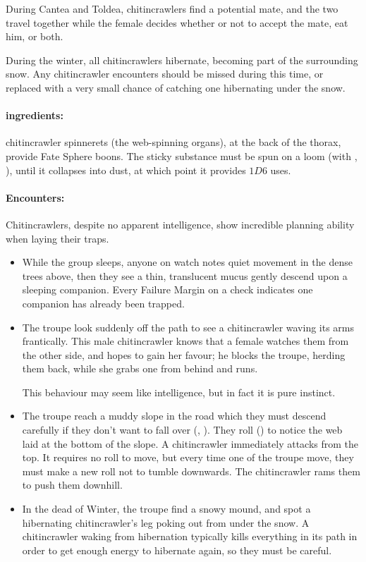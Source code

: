 \begin{multicols}{2}
During Cantea and Toldea, chitincrawlers find a potential mate, and the two travel together while the female decides whether or not to accept the mate, eat him, or both.

During the winter, all chitincrawlers hibernate, becoming part of the surrounding snow.
Any chitincrawler encounters should be missed during this time, or replaced with a very small chance of catching one hibernating under the snow.

\paragraph{\Glspl{ingredient}:}
chitincrawler spinnerets (the web-spinning organs), at the back of the thorax, provide Fate Sphere \glspl{boon}.
The sticky substance must be spun on a loom (with , \tn[10]), until it collapses into dust, at which point it provides $1D6$ uses.

\paragraph{Encounters:} Chitincrawlers, despite no apparent intelligence, show incredible planning ability when laying their traps.

\begin{itemize}
  \item
  While the group sleeps, anyone on watch notes quiet movement in the dense trees above, then they see a thin, translucent mucus gently descend upon a sleeping companion.
  Every Failure Margin on a  check indicates one companion has already been trapped.
  \item
  The troupe look suddenly off the path to see a chitincrawler waving its arms frantically.
  This male chitincrawler knows that a female watches them from the other side, and hopes to gain her favour; he blocks the troupe, herding them back, while she grabs one from behind and runs.

  This behaviour may seem like intelligence, but in fact it is pure instinct.
  \item
  The troupe reach a muddy slope in the road which they must descend carefully if they don't want to fall over (, \tn[7]).
  They roll  (\tn[8]) to notice the web laid at the bottom of the slope.
  A chitincrawler immediately attacks from the top.
  It requires no roll to move, but every time one of the troupe move, they must make a new roll not to tumble downwards.
  The chitincrawler rams them to push them downhill.
  \item
  In the dead of Winter, the troupe find a snowy mound, and spot a hibernating chitincrawler's leg poking out from under the snow.
  A chitincrawler waking from hibernation typically kills everything in its path in order to get enough energy to hibernate again, so they must be careful.
\end{itemize}


\end{multicols}
